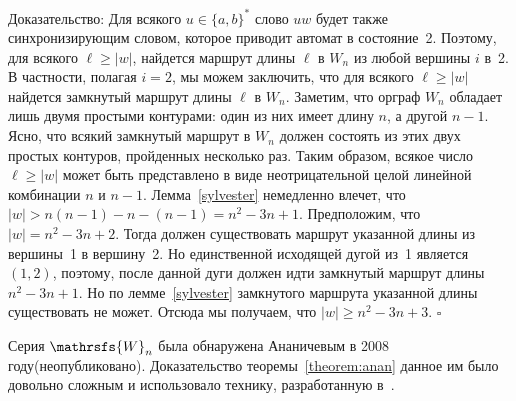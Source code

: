 \documentclass[11pt]{article}
\newenvironment{proof}{Доказательство:}{$\square$}
\begin{document}
\begin{proof}
Для всякого $u\in\{a,b\}^*$ слово $uw$ будет также синхронизирующим словом,
которое приводит автомат в состояние~2. Поэтому, для всякого $\ell\ge|w|$,
найдется маршрут длины $\ell$ в $W_n$ из любой вершины $i$ в~2. В частности,
полагая $i=2$, мы можем заключить, что для всякого $\ell\ge|w|$ найдется 
замкнутый маршрут длины $\ell$ в $W_n$. Заметим, что орграф $W_n$ обладает лишь 
двумя простыми контурами: один из них имеет длину $n$, а другой $n-1$. Ясно, что всякий 
замкнутый маршрут в $W_n$ должен состоять
из этих двух простых контуров, пройденных несколько раз.
Таким образом, всякое число $\ell\ge|w|$ может быть представлено в виде неотрицательной
целой линейной комбинации $n$ и $n-1$. Лемма~\ref{sylvester} немедленно влечет, что
$|w|>n(n-1)-n-(n-1)=n^2-3n+1$. Предположим, что $|w|=n^2-3n+2$.
Тогда должен существовать маршрут указанной длины из вершины~1 в вершину~2.
Но единственной исходящей дугой из~1 является $(1,2)$, поэтому, после данной дуги
должен идти замкнутый маршрут длины $n^2-3n+1$. Но по лемме~\ref{sylvester} 
замкнутого маршрута указанной длины существовать не может. 
Отсюда мы получаем, что $|w|\ge n^2-3n+3$.
\end{proof}

Серия $\mathrsfs{W}_n$ была обнаружена Ананичевым в 2008 году(неопубликовано). 
Доказательство теоремы~\ref{theorem:anan} данное им было довольно сложным и 
использовало технику, разработанную в~\cite{AVZ}.


\end{document}
